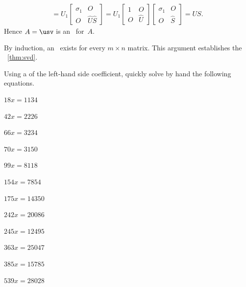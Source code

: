 \begin{enumerate}
\begin{eqnarray*}
=U_1\begin{bmatrix} \sigma_1&O \\O&\hat U\hat S \end{bmatrix}
=U_1\begin{bmatrix} 1&O \\O&\hat U \end{bmatrix}
\begin{bmatrix} \sigma_1&O \\O&\hat S \end{bmatrix}
=US.
\end{eqnarray*}
Hence \(A=\usv\) is an \svd\ for~\(A\). 
\end{enumerate}
By induction, an \svd\ exists for every \(m\times n\) matrix.
This argument establishes the \svd\ \cref{thm:svd}.







\sectionExercises



\begin{exercise}  
Using a  of the left-hand side coefficient, quickly solve by hand the following equations.
\begin{Parts}
\item \(18 x=1134\)
\begin{OmitV1}
\item \(42 x=2226\)
\item \(66 x=3234\)
\end{OmitV1}
\item \(70 x=3150\)
\item \(99 x=8118\)
\begin{OmitV1}
\item \(154 x=7854\)
\item \(175 x=14350\)
\end{OmitV1}
\item \(242 x=20086\)
\item \(245 x=12495\)
\begin{OmitV1}
\item \(363 x=25047\)
\item \(385 x=15785\)
\end{OmitV1}
\item \(539 x=28028\)
\end{Parts}
\end{exercise}




